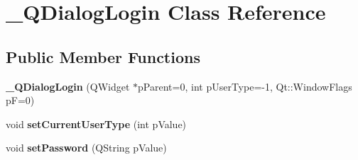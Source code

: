 \hypertarget{class__QDialogLogin}{
\section{\_\-QDialogLogin Class Reference}
\label{class__QDialogLogin}
}
\subsection*{Public Member Functions}
\begin{DoxyCompactItemize}
\item 
\hypertarget{class__QDialogLogin_a31d3cd9c7c559328ffc01d39d63da268}{
{\bfseries \_\-QDialogLogin} (QWidget $\ast$pParent=0, int pUserType=-\/1, Qt::WindowFlags pF=0)}
\label{class__QDialogLogin_a31d3cd9c7c559328ffc01d39d63da268}

\item 
\hypertarget{class__QDialogLogin_a9ee6d5ba17f363fb4f4a370e2414f5e8}{
void {\bfseries setCurrentUserType} (int pValue)}
\label{class__QDialogLogin_a9ee6d5ba17f363fb4f4a370e2414f5e8}

\item 
\hypertarget{class__QDialogLogin_a59d1e0bb5593b51973d69e236fcea4ae}{
void {\bfseries setPassword} (QString pValue)}
\label{class__QDialogLogin_a59d1e0bb5593b51973d69e236fcea4ae}

\end{DoxyCompactItemize}
